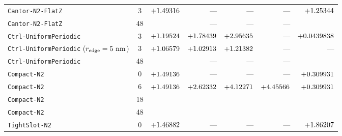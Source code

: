 \begin{table}[!htbp]
{\begin{tabular}{lcrrrrr}
\texttt{Cantor-N2-FlatZ} & 3 & $+1.49316{}$ & --- & --- & --- & $+1.25344{}$ \\
\texttt{Cantor-N2-FlatZ} & 48 & \CantorNtwoFlatzBemThetafoureightFZPn{} & --- & --- & --- & \CantorNtwoFlatzMeepThetafoureightFZPn{} \\
\texttt{Ctrl-UniformPeriodic} & 3 & $+1.19524{}$ & $+1.78439{}$ & $+2.95635{}$ & --- & $+0.0439838{}$ \\
\texttt{Ctrl-UniformPeriodic} ($r_{\rm edge}=5\text{ nm}$) & 3 & $+1.06579{}$ & $+1.02913{}$ & $+1.21382{}$ & --- & --- \\
\texttt{Ctrl-UniformPeriodic} & 48 & \CtrlUniformperiodicBemThetafoureightFZPn{} & --- & --- & --- & \CtrlUniformperiodicMeepThetafoureightFZPn{} \\
\texttt{Compact-N2} & 0 & $+1.49136{}$ & --- & --- & --- & $+0.309931{}$ \\
\texttt{Compact-N2} & 6 & $+1.49136{}$ & $+2.62332{}$ & $+4.12271{}$ & $+4.45566{}$ & $+0.309931{}$ \\
\texttt{Compact-N2} & 18 & \RotCeightCompactNtwoStandardThetaZerooneeightpzeroVectorDyadicFZPn{} & \RotCeightCompactNtwoHighThetaZerooneeightpzeroVectorDyadicFZPn{} & \RotCeightCompactNtwoUltraHighThetaZerooneeightpzeroVectorDyadicFZPn{} & \RotCeightCompactNtwoHighThetaZerooneeightpzeroScalarYukawaFZPn{} & \RotCeightCompactNtwoMeepThetaoneeightFZPn{} \\
\texttt{Compact-N2} & 48 & \RotCeightCompactNtwoStandardThetaZerofoureightpzeroVectorDyadicFZPn{} & \RotCeightCompactNtwoHighThetaZerofoureightpzeroVectorDyadicFZPn{} & \RotCeightCompactNtwoUltraHighThetaZerofoureightpzeroVectorDyadicFZPn{} & \RotCeightCompactNtwoHighThetaZerofoureightpzeroScalarYukawaFZPn{} & \RotCeightCompactNtwoMeepThetafoureightFZPn{} \\
\texttt{TightSlot-N2} & 0 & $+1.46882{}$ & --- & --- & --- & $+1.86207{}$ \\

\end{tabular}}
\end{table}
